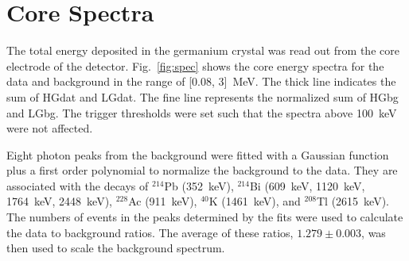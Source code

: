 \documentclass{elsart}
\begin{document}
\section{Core Spectra}
\label{sec:spec}
The total energy deposited in the germanium crystal was read out from
the core electrode of the detector. Fig.~\ref{fig:spec} shows the core
energy spectra for the data and background in the range of [0.08,
3]~MeV. The thick line indicates the sum of HGdat and LGdat. The fine
line represents the normalized sum of HGbg and LGbg. The trigger
thresholds were set such that the spectra above 100~keV were not
affected.

Eight photon peaks from the background were fitted with a Gaussian
function plus a first order polynomial to normalize the background to
the data.  They are associated with the decays of $^{214}$Pb
(352~keV), $^{214}$Bi (609~keV, 1120~keV, 1764~keV, 2448~keV),
$^{228}$Ac (911~keV), $^{40}$K (1461~keV), and $^{208}$Tl
(2615~keV). The numbers of events in the peaks determined by the fits
were used to calculate the data to background ratios. The average of
these ratios, $1.279 \pm 0.003$, was then used to scale the background
spectrum.
\end{document}

